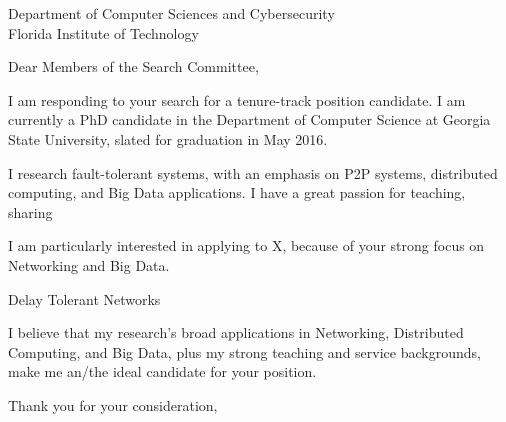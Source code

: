 \documentclass[12pt]{letter}
\date{}
\begin{document}
 
\begin{letter}{Department of Computer Sciences and Cybersecurity\\ Florida Institute of Technology} 
\opening{Dear Members of the Search Committee,} 
 
I am responding to your search for a tenure-track position candidate.
I am currently a PhD candidate in the Department of Computer Science at Georgia State University, slated for graduation in May 2016.


I research fault-tolerant systems, with an emphasis  on P2P systems, distributed computing, and Big Data applications.
I have a great passion for teaching, sharing 


I am particularly interested in applying to X, because of your strong focus on Networking and Big Data.


Delay Tolerant Networks

I believe that my research's broad applications in Networking, Distributed Computing, and Big Data, plus my strong teaching and service backgrounds, make me an/the ideal candidate for your position.


\closing{Thank you for your consideration,} 
\end{letter} 
\end{document}
